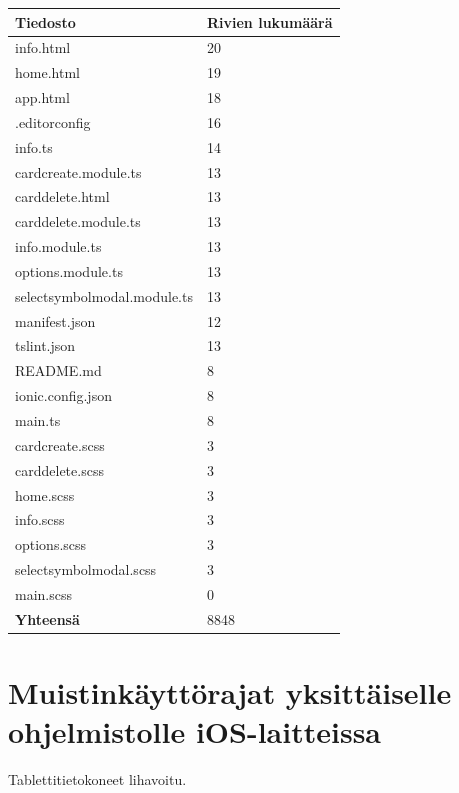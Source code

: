 \documentclass[utf8]{gradu3}
\begin{document}
\begin{center}
    \begin{tabular}{ | l | l |}
    \hline
    \textbf{Tiedosto} & \textbf{Rivien lukumäärä} \\ \hline
    info.html & 20 \\ \hline
    home.html & 19 \\ \hline
    app.html & 18 \\ \hline
    .editorconfig & 16 \\ \hline
    info.ts & 14 \\ \hline
    cardcreate.module.ts & 13 \\ \hline
    carddelete.html & 13 \\ \hline
    carddelete.module.ts & 13 \\ \hline
    info.module.ts & 13 \\ \hline
    options.module.ts & 13 \\ \hline
    selectsymbolmodal.module.ts & 13 \\ \hline
    manifest.json & 12 \\ \hline
    tslint.json & 13 \\ \hline
    README.md & 8 \\ \hline
    ionic.config.json & 8 \\ \hline
    main.ts & 8 \\ \hline
    cardcreate.scss & 3 \\ \hline
    carddelete.scss & 3 \\ \hline
    home.scss & 3 \\ \hline
    info.scss & 3 \\ \hline
    options.scss & 3 \\ \hline
    selectsymbolmodal.scss & 3 \\ \hline
    main.scss & 0 \\ \hline
    \textbf{Yhteensä} & 8848 \\
    \hline
    \end{tabular}
\end{center}

\section{Muistinkäyttörajat yksittäiselle ohjelmistolle iOS-laitteissa}

Tablettitietokoneet lihavoitu.
\end{document}
